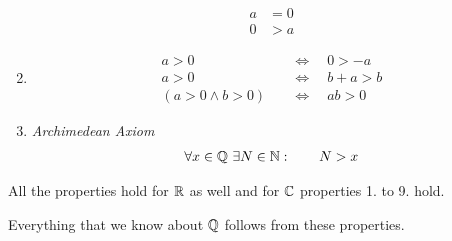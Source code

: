 \begin{pr}
\begin{enumerate}
\begin{align*}
		a & = 0 \\
		0 & > a
		\end{align*}
		\item
		\begin{align*}
		a >0 \quad & \Leftrightarrow \quad 0  > -a \\
		a >0 \quad & \Leftrightarrow \quad b+a  > b \\
		(a >0 \wedge b > 0) \quad & \Leftrightarrow \quad ab > 0 
		\end{align*}
		\item
		\emph{Archimedean Axiom}
		\begin{align*}
		\forall x \in \mathbb Q ~\exists N \in \mathbb N: \qquad N > x
		\end{align*}
	\end{enumerate}
	All the properties hold for $\mathbb R$ as well and for $\mathbb C$ properties 1. to 9. hold.
\end{pr}

Everything that we know about $\mathbb Q$ follows from these properties.

